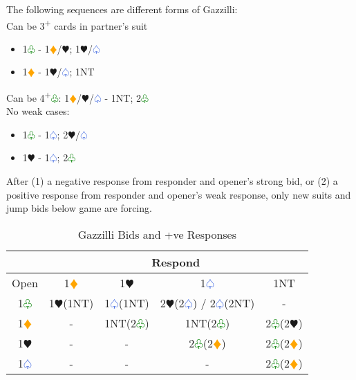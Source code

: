 \documentclass{article}
\renewcommand{\sp}{\textcolor{RoyalBlue}{$\varspade$}}
\newcommand{\he}{\textcolor{RubineRed}{$\varheart$}}
\newcommand{\di}{\textcolor{Orange}{$\vardiamond$}}
\newcommand{\cl}{\textcolor{Green}{$\varclub$}}
\newcommand{\nt}{\relsize{-1}NT\relsize{1}}
\newcommand{\up}{\textsuperscript{+}}
\begin{document}
The following sequences are different forms of Gazzilli: \\
Can be 3\up{} cards in partner's suit
\begin{itemize}
	\itemsep0em
	\item 1\cl{} - 1\di{}/\he{}; 1\he{}/\sp{}
	\item 1\di{} - 1\he{}/\sp{}; 1\nt{}
\end{itemize}
Can be 4\up{}\cl{}: 1\di{}/\he{}/\sp{} - 1\nt{}; 2\cl{} \\

No weak cases: 
\begin{itemize}
	\itemsep0em
	\item 1\cl{} - 1\sp{}; 2\he{}/\sp{}
	\item 1\he{} - 1\sp{}; 2\cl{}
\end{itemize}


After (1) a negative response from responder and opener’s strong bid, or (2) a positive response from responder and opener’s weak response, only new suits and jump bids below game are forcing. 

\begin{table}[htbp]
    \centering
    \caption{Gazzilli Bids and +ve Responses}
    \begin{tabular}{|c|c|c|c|c|}
        \hline
         & \multicolumn{4}{|c|}{Respond} \\\hline
        Open & 1\di{} & 1\he{} & 1\sp{} & 1\nt{} \\\hline
        1\cl{} & 1\he{}(1\nt{}) & 1\sp{}(1\nt{}) & 2\he{}(2\sp{}) / 2\sp{}(2\nt) & - \\\hline
        1\di{} & - & 1\nt{}(2\cl) & 1\nt{}(2\cl{}) & 2\cl{}(2\he{}) \\\hline
        1\he{} & - & - & 2\cl{}(2\di{}) & 2\cl{}(2\di{}) \\\hline
        1\sp{} & - & - & - & 2\cl{}(2\di{}) \\\hline
    \end{tabular}
\end{table}

\medskip
\end{document}
